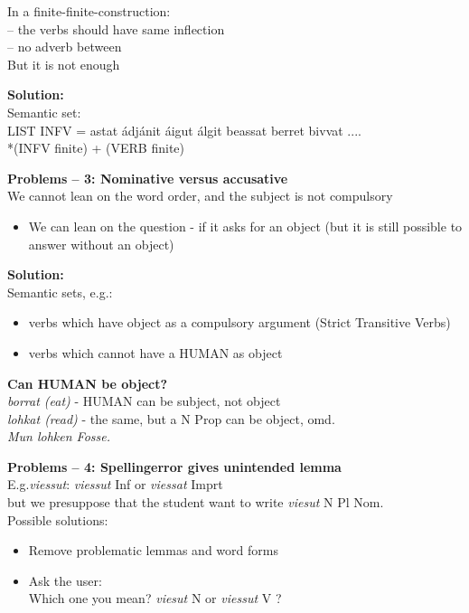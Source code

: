 \documentclass[landscape,norsk,11pt]{seminar}
\begin{document}
\begin{slide}
In a finite-finite-construction:\\ -- the verbs should have same inflection\\
-- no adverb between\\
But it is not enough

\newslide
\textbf{Solution:} \\
Semantic set:\\
LIST INFV =  astat ádjánit áigut álgit beassat berret bivvat .... \\
\textnormal{*(INFV finite) + (VERB finite)}


\newslide
\textbf{Problems -- 3: Nominative versus accusative} \\
We cannot lean on the word order, and the subject is not compulsory
\begin{itemize}
\item We can lean on the question - if it asks for an object (but it is still possible to answer without an object)
\end{itemize}
\newslide
\textbf{Solution:} \\
Semantic sets, e.g.: 
\begin{itemize}
\item verbs which have object as a compulsory argument (Strict Transitive Verbs)
\item verbs which cannot have a HUMAN as object
\end{itemize}

\newslide
\textbf{Can HUMAN be object?} \\

 \textit{borrat (eat)}   - HUMAN can be subject, not object \\
 
  \textit{lohkat (read)}  - the same, but a N Prop can be object, omd.  \\ \textit{Mun lohken Fosse.}


\newslide
\textbf{Problems -- 4: Spellingerror gives unintended lemma} \\
E.g.\textit{viessut}: \textit{viessut} Inf or \textit{viessat} Imprt \\
but we presuppose that the student want to write \textit{viesut} N Pl Nom. \\
Possible solutions:

\begin{itemize}
\item{Remove problematic lemmas and word forms}
\item{Ask the user: \\ Which one you mean? \textit{viesut}  N or \textit{viessut} V }?
\end{itemize}



\end{slide}
\end{document}
